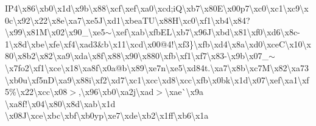 I\+P4\textbackslash{}x86\textbackslash{}xb0\textbackslash{}x1d\textbackslash{}x9b\textbackslash{}x88\textbackslash{}xcf\textbackslash{}xef\textbackslash{}xa0\textbackslash{}xcd;i\+Q\textbackslash{}xb7\textbackslash{}x80\+E\textbackslash{}x00p7\textbackslash{}xc0\textbackslash{}xc1\textbackslash{}xc9\textbackslash{}x0c\textbackslash{}x92\textbackslash{}x22\textbackslash{}x8e\textbackslash{}xa7\textbackslash{}xe5\+J\textbackslash{}xd1\textbackslash{}xbea\+T\+U\textbackslash{}x88\+H\textquotesingle{}\textbackslash{}xc0\textbackslash{}xf1\textbackslash{}xb4\textbackslash{}x84?\textbackslash{}x99\textbackslash{}x81\+M\textbackslash{}x02\textbackslash{}x90\+\_\+\textbackslash{}xe5$\sim$\textbackslash{}xef\textbackslash{}xab\textbackslash{}xfb\textquotesingle{}\+E\+L\textbackslash{}xb7\textbackslash{}x96\+J\textbackslash{}xbd\textbackslash{}x81\textbackslash{}xf0\textbackslash{}xd6\textbackslash{}x8c-\/1\textbackslash{}x8d\textbackslash{}xbe\textbackslash{}xfe\textbackslash{}xf4\textbackslash{}xad3\&b\textbackslash{}x11\textbackslash{}xcd\textbackslash{}x00@4!\textbackslash{}xf3\}\textbackslash{}xfb\textbackslash{}xd4\textbackslash{}x8a\textbackslash{}xd0\textbackslash{}xce\+C\textbackslash{}x10\textbackslash{}x80\textbackslash{}x8b2\textbackslash{}x82\textbackslash{}xa9\textbackslash{}xda\textbackslash{}x8f\textbackslash{}x88\textbackslash{}x90\textbackslash{}x880\textbackslash{}xfb\textbackslash{}xf1\textbackslash{}xf7\textbackslash{}x83-\/\textbackslash{}x9b\textbackslash{}x07\+\_\+$\sim$\textbackslash{}x7fo2\textbackslash{}xf1\textbackslash{}xce\textbackslash{}x18\textbackslash{}xa8f\textbackslash{}x0a@b\textbackslash{}x89\textbackslash{}xe7n\textbackslash{}xe5\textbackslash{}xd84t.\textbackslash{}xa7\textbackslash{}x8b\textbackslash{}xc7\+M\textbackslash{}x82\textquotesingle{}\textbackslash{}xa73\textbackslash{}xb0u\textbackslash{}xf5n\+D\textbackslash{}xa9\textbackslash{}x88i\textbackslash{}xf2\textbackslash{}xd7\textbackslash{}xc1\textbackslash{}xcc\textbackslash{}xd8\textbackslash{}xcc\textbackslash{}xfb\textbackslash{}x0bk\textbackslash{}x1d\textbackslash{}x07\textbackslash{}xef\textbackslash{}xa1\textbackslash{}xf5\%\textbackslash{}x22\textbackslash{}xcc\textbackslash{}x08$>$,\textbackslash{}x96\textbackslash{}xb0\textbackslash{}xa2j\textbackslash{}xad$>$\textbackslash{}xae\`{}\textbackslash{}x9a \textbackslash{}xa8f!\textbackslash{}x04\textbackslash{}x80\textbackslash{}x8d\textbackslash{}xab\textbackslash{}x1d \textbackslash{}x08\+J\textbackslash{}xce\textbackslash{}xbc\textbackslash{}xbf\textbackslash{}xb0yp\textbackslash{}xe7\textbackslash{}xde\textbackslash{}xb2\textbackslash{}x1ff\textbackslash{}xb6\textbackslash{}x1a 